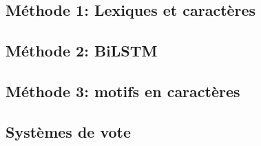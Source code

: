 \label{sec:methodes}

\subsection{Méthode 1: Lexiques et caractères}


\subsection{Méthode 2: BiLSTM}


\subsection{Méthode 3: motifs en caractères}


\subsection{Systèmes de vote}

